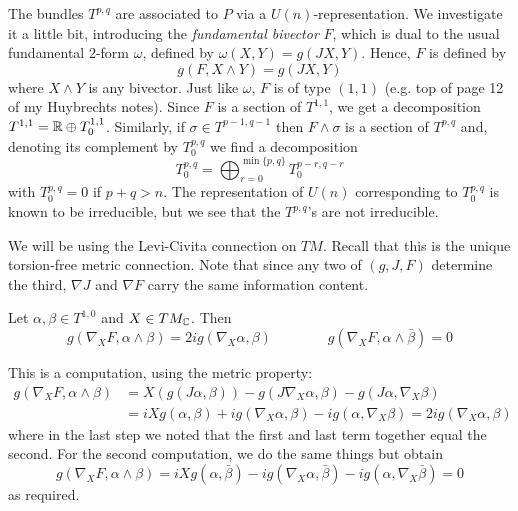 \documentclass{scrartcl}
\begin{document}
The bundles $T^{p,q}$ are associated to $P$ via a $U(n)$-representation. We investigate it a little bit, introducing the \emph{fundamental bivector} $F$, which is dual to the usual fundamental 2-form $\omega$, defined by $\omega(X,Y)=g(JX,Y)$. Hence, $F$ is defined by
\begin{equation*}
	g(F,X\wedge Y)=g(JX,Y)
\end{equation*}
where $X\wedge Y$ is any bivector. Just like $\omega$, $F$ is of type $(1,1)$ (e.g. top of page 12 of my Huybrechts notes). Since $F$ is a section of $T^{1,1}$, we get a decomposition $T^{1,1}=\mathbb{R}\oplus T^{1,1}_0$.
Similarly, if $\sigma\in T^{p-1,q-1}$ then $F\wedge\sigma$ is a section of $T^{p,q}$ and, denoting its complement by $T^{p,q}_0$ we find a decomposition 
\begin{equation*}
	T^{p,q}_0=\bigoplus_{r=0}^{\min\{p,q\}}T^{p-r,q-r}_0 
\end{equation*}
with $T^{p,q}_0=0$ if $p+q>n$. The representation of $U(n)$ corresponding to $T^{p,q}_0$ is known to be irreducible, but we see that the $T^{p,q}$'s are not irreducible.

\medskip

We will be using the Levi-Civita connection on $TM$. Recall that this is the unique torsion-free metric connection. Note that since any two of $(g,J,F)$ determine the third, $\nabla J$ and $\nabla F$ carry the same information content. 

\begin{lem}
	Let $\alpha,\beta\in T^{1,0}$ and $X\in TM_{\mathbb{C}}$. Then 
	\begin{equation*}
		g(\nabla_X F,\alpha\wedge\beta)=2ig(\nabla_X\alpha,\beta) \qquad \qquad 
		g(\nabla_X F,\alpha\wedge\bar\beta)=0
	\end{equation*}
\end{lem}
\begin{myproof}
	This is a computation, using the metric property:
	\begin{align*}
		g(\nabla_X F,\alpha\wedge\beta)
		&=X(g(J\alpha,\beta))-g(J\nabla_X \alpha,\beta)-g(J\alpha,\nabla_X\beta)\\
		&=iXg(\alpha,\beta)+ig(\nabla_X \alpha,\beta)-ig(\alpha,\nabla_X\beta)
		=2ig(\nabla_X\alpha,\beta)
	\end{align*}
	where in the last step we noted that the first and last term together equal the second. For the second computation, we do the same things but obtain
	\begin{equation*}
		g(\nabla_X F,\alpha\wedge\beta)
		=iXg(\alpha,\bar\beta)-ig(\nabla_X \alpha,\bar\beta)
		-ig(\alpha,\nabla_X\bar\beta)=0
	\end{equation*}
	as required.
\end{myproof}
\end{document}
